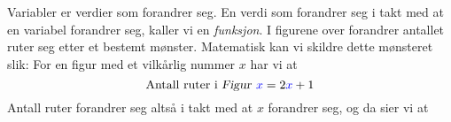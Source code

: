 





\newpage
\section{\fintro}
Variabler er verdier som forandrer seg. En verdi som forandrer seg i takt med at en variabel forandrer seg, kaller vi en \textit{funksjon}.\vsk
{}
I figurene over forandrer antallet ruter seg etter et bestemt mønster. Matematisk kan vi skildre dette mønsteret slik:
For en figur med et vilkårlig nummer $ x $ har vi at
\[ \text{Antall ruter i \textsl{Figur }}{\color{blue}x}=2{\color{blue}x}+1 \]
Antall ruter forandrer seg altså i takt med at $ x $ forandrer seg, og da sier vi at\regv
\st{}\regv

